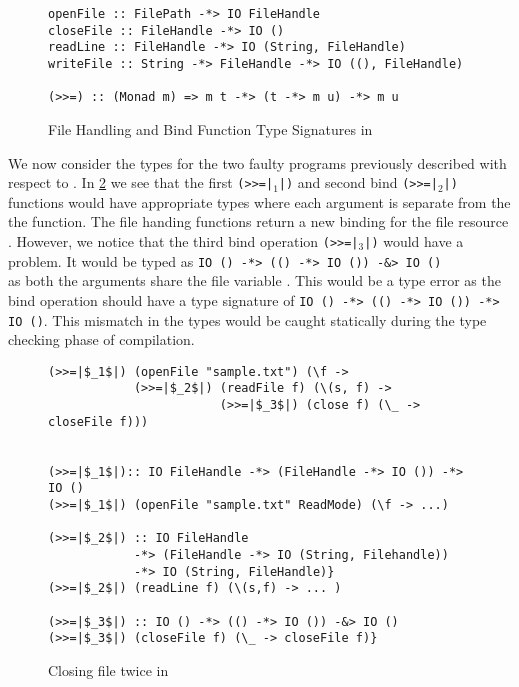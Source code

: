 \begin{figure}[h]
  \begin{framed}
    \begin{verbatim}
openFile :: FilePath -*> IO FileHandle
closeFile :: FileHandle -*> IO ()
readLine :: FileHandle -*> IO (String, FileHandle)
writeFile :: String -*> FileHandle -*> IO ((), FileHandle)

(>>=) :: (Monad m) => m t -*> (t -*> m u) -*> m u
    \end{verbatim}
  \end{framed}
  \caption{File Handling and Bind Function Type Signatures in \qub{}}
  \label{fig:qub-file-handling-functions}
\end{figure}

We now consider the types for the two faulty programs previously described with respect to \qub{}.
In \cref{fig:qub-close-file-twice} we see that the first \texttt{(>>=|$_1$|)}
and second bind \texttt{(>>=|$_2$|)} functions would have appropriate types
where each argument is separate from the the function. The file handing functions
return a new binding for the file resource . However, we notice that the third bind operation
\texttt{(>>=|$_3$|)} would have a problem. It  would be typed as
\texttt{IO () -*> (() -*> IO ()) -&> IO ()}\\
as both the arguments share the file variable . This would be a type error
as the bind operation should have a type signature of \texttt{IO () -*> (() -*> IO ()) -*> IO ()}.
This mismatch in the types would be caught statically during the type checking phase of compilation.

\begin{figure}[h]
\begin{framed}
\begin{verbatim}
(>>=|$_1$|) (openFile "sample.txt") (\f ->
            (>>=|$_2$|) (readFile f) (\(s, f) ->
                        (>>=|$_3$|) (close f) (\_ -> closeFile f)))


(>>=|$_1$|):: IO FileHandle -*> (FileHandle -*> IO ()) -*> IO ()
(>>=|$_1$|) (openFile "sample.txt" ReadMode) (\f -> ...)

(>>=|$_2$|) :: IO FileHandle
            -*> (FileHandle -*> IO (String, Filehandle))
            -*> IO (String, FileHandle)}
(>>=|$_2$|) (readLine f) (\(s,f) -> ... )

(>>=|$_3$|) :: IO () -*> (() -*> IO ()) -&> IO ()
(>>=|$_3$|) (closeFile f) (\_ -> closeFile f)}
\end{verbatim}
\end{framed}
\caption{Closing file twice in \qub{}}
\label{fig:qub-close-file-twice}
\end{figure}

